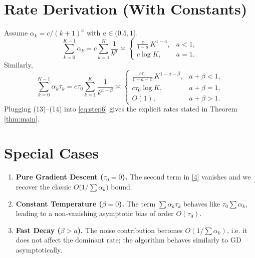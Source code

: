 \documentclass{article}
\begin{document}
\section*{Rate Derivation (With Constants)}
Assume $\alpha_{k}=c/(k+1)^{a}$ with $a\in(0.5,1]$.
\[
\sum_{k=0}^{K-1}\alpha_{k}
= c\sum_{k=1}^{K}\frac{1}{k^{a}}
\asymp 
\begin{cases}
\displaystyle \frac{c}{1-a}\,K^{1-a}, & a<1,\\[1mm]
c\log K, & a=1 .
\end{cases}
\tag{13}
\]
Similarly,
\[
\sum_{k=0}^{K-1}\alpha_{k}\tau_{k}
= c\tau_{0}\sum_{k=1}^{K}\frac{1}{k^{a+\beta}}
\asymp 
\begin{cases}
\displaystyle \frac{c\tau_{0}}{1-a-\beta}\,K^{1-a-\beta},
   & a+\beta<1,\\[1mm]
c\tau_{0}\log K, & a+\beta=1,\\[1mm]
O(1), & a+\beta>1 .
\end{cases}
\tag{14}
\]
Plugging (13)–(14) into \eqref{eq:step6} gives the explicit rates stated in Theorem \ref{thm:main}.

\section*{Special Cases}
\begin{enumerate}
  \item \textbf{Pure Gradient Descent ($\tau_{0}=0$).} The second term in \eqref{4} vanishes and we recover the classic $O\!\bigl(1/\sum\alpha_{k}\bigr)$ bound.
  \item \textbf{Constant Temperature ($\beta=0$).} The term $\sum\alpha_{k}\tau_{k}$ behaves like $\tau_{0}\sum\alpha_{k}$, leading to a non‑vanishing asymptotic bias of order $O(\tau_{0})$.
  \item \textbf{Fast Decay ($\beta> a$).} The noise contribution becomes $O(1/\sum\alpha_{k})$, i.e. it does not affect the dominant rate; the algorithm behaves similarly to GD asymptotically.
\end{enumerate}
\end{document}
